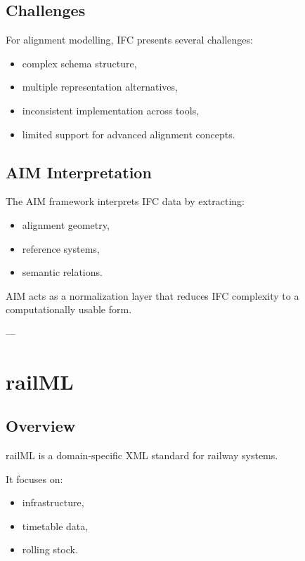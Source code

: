 \subsection{Challenges}

\begin{remark}
For alignment modelling, IFC presents several challenges:
\begin{itemize}
\item complex schema structure,
\item multiple representation alternatives,
\item inconsistent implementation across tools,
\item limited support for advanced alignment concepts.
\end{itemize}
\end{remark}

\subsection{AIM Interpretation}

\begin{remark}
The AIM framework interprets IFC data by extracting:
\begin{itemize}
\item alignment geometry,
\item reference systems,
\item semantic relations.
\end{itemize}
\end{remark}

\begin{remark}
AIM acts as a normalization layer that reduces IFC complexity to a
computationally usable form.
\end{remark}

---

\section{railML}

\subsection{Overview}

\begin{remark}
railML is a domain-specific XML standard for railway systems.
\end{remark}

\begin{remark}
It focuses on:
\begin{itemize}
\item infrastructure,
\item timetable data,
\item rolling stock.
\end{itemize}
\end{remark}

